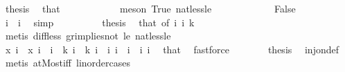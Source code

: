 \begin{isabellebody}
\ {\isacharquery}{\kern0pt}thesis\ \isamarkupfalse%
\ that\ {\isacharasterisk}{\kern0pt}\ \isanewline
\ \ \ \ \ \ \ \ \isamarkupfalse%
\ {\isacharparenleft}{\kern0pt}meson\ True\ nat{\isacharunderscore}{\kern0pt}less{\isacharunderscore}{\kern0pt}le{\isacharparenright}{\kern0pt}\isanewline
\ \ \ \ \isamarkupfalse%
\isanewline
\ \ \ \ \ \ \isamarkupfalse%
\ False\isanewline
\ \ \ \ \ \ \isamarkupfalse%
\ \isamarkupfalse%
\ {\isachardoublequoteopen}i{}\ {\isacharless}{\kern0pt}\ i{}{\isachardoublequoteclose}\ \isamarkupfalse%
\ simp\isanewline
\ \ \ \ \ \ \isamarkupfalse%
\ \isamarkupfalse%
\ {\isacharquery}{\kern0pt}thesis\ \isamarkupfalse%
\ that\ {\isacharasterisk}{\kern0pt}{\isacharbrackleft}{\kern0pt}of\ i{}\ i{}{\isacharbrackright}{\kern0pt}\ {\isacartoucheopen}k\ {\isachargreater}{\kern0pt}\ {}{\isacartoucheclose}\ \ \isanewline
\ \ \ \ \ \ \ \ \isamarkupfalse%
\ {\isacharparenleft}{\kern0pt}metis\ diff{\isacharunderscore}{\kern0pt}less\ gr{\isacharunderscore}{\kern0pt}implies{\isacharunderscore}{\kern0pt}not{}\ le{}\ nat{\isacharunderscore}{\kern0pt}less{\isacharunderscore}{\kern0pt}le{\isacharparenright}{\kern0pt}\isanewline
\ \ \ \ \isamarkupfalse%
\isanewline
\ \ \ \ \isamarkupfalse%
\ \isamarkupfalse%
\ {\isachardoublequoteopen}x\ i{}\ {\isasymnoteq}\ x\ i{}{\isachardoublequoteclose}\ \ {\isachardoublequoteopen}i{}\ {\isasymle}\ k{\isachardoublequoteclose}\ {\isachardoublequoteopen}i{}\ {\isasymle}\ k{\isachardoublequoteclose}\ {\isachardoublequoteopen}i{}\ {\isasymnoteq}\ i{}{\isachardoublequoteclose}\ {\isachardoublequoteopen}i{}\ {\isacharless}{\kern0pt}\ i{}{\isachardoublequoteclose}\ \ i{}\ i{}\ \isamarkupfalse%
\ that\ \isamarkupfalse%
\ fastforce\isanewline
\ \ \ \ \isamarkupfalse%
\ \isamarkupfalse%
\ {\isacharquery}{\kern0pt}thesis\ \isamarkupfalse%
\ inj{\isacharunderscore}{\kern0pt}on{\isacharunderscore}{\kern0pt}def\ \ \isamarkupfalse%
\ {\isacharparenleft}{\kern0pt}metis\ atMost{\isacharunderscore}{\kern0pt}iff\ linorder{\isacharunderscore}{\kern0pt}cases{\isacharparenright}{\kern0pt}\isanewline

\end{isabellebody}
